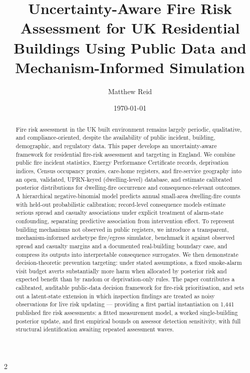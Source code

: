 \documentclass[11pt]{article}
\title{Uncertainty-Aware Fire Risk Assessment for UK Residential Buildings
Using Public Data and Mechanism-Informed Simulation}
\author{Matthew Reid}
\date{\today}
\begin{document}
\linenumbers
\maketitle

\begin{abstract}
Fire risk assessment in the UK built environment remains largely periodic,
qualitative, and compliance-oriented, despite the availability of public
incident, building, demographic, and regulatory data. This paper develops an
uncertainty-aware framework for residential fire-risk assessment and targeting
in England. We combine public fire incident statistics, Energy Performance
Certificate records, deprivation indices, Census occupancy proxies, care-home
registers, and fire-service geography into an open, validated,
UPRN-keyed (dwelling-level) database, and estimate calibrated posterior distributions for
dwelling-fire occurrence and consequence-relevant outcomes. A hierarchical
negative-binomial model predicts annual small-area dwelling-fire counts with
held-out probabilistic calibration; record-level consequence models estimate
serious spread and casualty associations under explicit treatment of
alarm-state confounding, separating predictive association from intervention
effect. To represent building mechanisms not observed in public registers, we
introduce a transparent, mechanism-informed archetype fire/egress simulator,
benchmark it against observed spread and casualty margins and a documented
real-building boundary case, and compress its outputs into interpretable
consequence surrogates. We then demonstrate decision-theoretic prevention
targeting: under stated assumptions, a fixed smoke-alarm visit budget averts
substantially more harm when allocated by posterior risk and expected benefit
than by random or deprivation-only rules. The paper contributes a calibrated,
auditable public-data decision framework for fire-risk prioritisation, and
sets out a latent-state extension in which inspection findings are treated as
noisy observations for live risk updating --- providing a first partial
instantiation on 1{,}441 published fire risk assessments: a fitted
measurement model, a worked single-building posterior update, and first
empirical bounds on assessor detection sensitivity, with full structural
identification awaiting repeated assessment waves.
\end{abstract}










\appendix


{\footnotesize
\setlength{\columnsep}{18pt}
\begin{multicols}{2}


\end{multicols}
}
\end{document}
